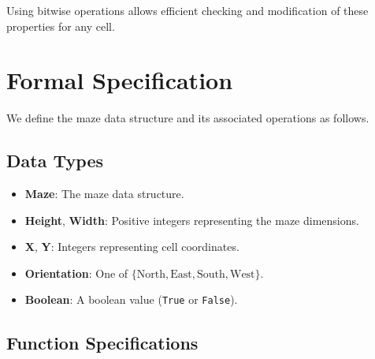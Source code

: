 \documentclass{article}
\begin{document}
Using bitwise operations allows efficient checking and modification of these properties for any cell.

\section*{Formal Specification}

We define the maze data structure and its associated operations as follows.

\subsection*{Data Types}

\begin{itemize}
    \item \textbf{Maze}: The maze data structure.
    \item \textbf{Height}, \textbf{Width}: Positive integers representing the maze dimensions.
    \item \textbf{X}, \textbf{Y}: Integers representing cell coordinates.
    \item \textbf{Orientation}: One of \(\{\text{North}, \text{East}, \text{South}, \text{West}\}\).
    \item \textbf{Boolean}: A boolean value (\texttt{True} or \texttt{False}).
\end{itemize}

\subsection*{Function Specifications}
\end{document}
